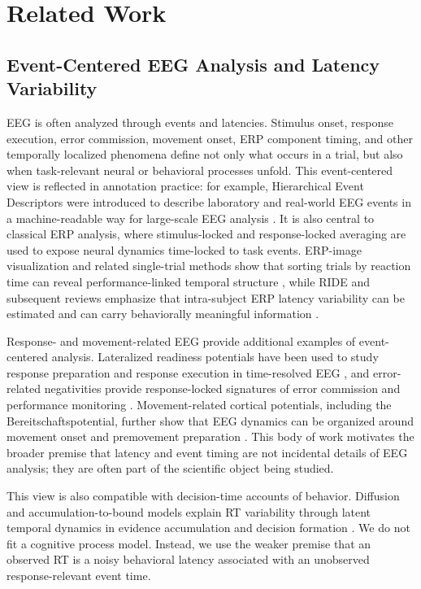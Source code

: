 \section{Related Work}

\subsection{Event-Centered EEG Analysis and Latency Variability}

EEG is often analyzed through events and latencies. Stimulus onset, response execution, error commission, movement onset, ERP component timing, and other temporally localized phenomena define not only what occurs in a trial, but also when task-relevant neural or behavioral processes unfold. This event-centered view is reflected in annotation practice: for example, Hierarchical Event Descriptors were introduced to describe laboratory and real-world EEG events in a machine-readable way for large-scale EEG analysis \citep{BigdelyShamlo2016HED}. It is also central to classical ERP analysis, where stimulus-locked and response-locked averaging are used to expose neural dynamics time-locked to task events. ERP-image visualization and related single-trial methods show that sorting trials by reaction time can reveal performance-linked temporal structure \citep{Jung1998}, while RIDE and subsequent reviews emphasize that intra-subject ERP latency variability can be estimated and can carry behaviorally meaningful information \citep{Ouyang2011RIDE,Ouyang2017}.

Response- and movement-related EEG provide additional examples of event-centered analysis. Lateralized readiness potentials have been used to study response preparation and response execution in time-resolved EEG \citep{Coles1989LRP}, and error-related negativities provide response-locked signatures of error commission and performance monitoring \citep{Gehring1993ErrorDetection,HolroydColes2002ERN}. Movement-related cortical potentials, including the Bereitschaftspotential, further show that EEG dynamics can be organized around movement onset and premovement preparation \citep{KornhuberDeecke1965BP,ShibasakiHallett2006BP}. This body of work motivates the broader premise that latency and event timing are not incidental details of EEG analysis; they are often part of the scientific object being studied.

This view is also compatible with decision-time accounts of behavior. Diffusion and accumulation-to-bound models explain RT variability through latent temporal dynamics in evidence accumulation and decision formation \citep{Ratcliff2008,OConnell2012,Kelly2013}. We do not fit a cognitive process model. Instead, we use the weaker premise that an observed RT is a noisy behavioral latency associated with an unobserved response-relevant event time.

